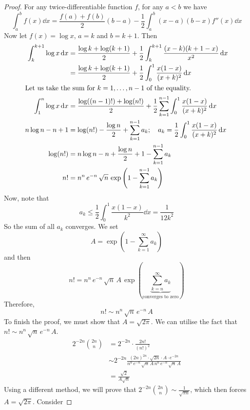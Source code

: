 \documentclass{article}
\begin{document}
\begin{proof}
	For any twice-differentiable function $f$, for any $a < b$ we have
	\[ \int_a^b f(x) \dd{x} = \frac{f(a) + f(b)}{2} (b - a) - \frac{1}{2}\int_a^b (x-a)(b-x)f''(x)\dd{x} \]
	Now let $f(x) = \log x$, $a=k$ and $b=k+1$. Then
	\begin{align*}
		\int_k^{k+1} \log x \dd{x} & = \frac{\log k + \log(k+1)}{2} + \frac{1}{2}\int_k^{k+1} \frac{(x-k)(k+1-x)}{x^2}\dd{x}                            \\
		                           & = \frac{\log k + \log(k+1)}{2} + \frac{1}{2}\int_0^1 \frac{x(1-x)}{(x+k)^2}\dd{x}                                  \\
		\intertext{Let us take the sum for $k=1, \dots, n-1$ of the equality.}
		\int_1^n \log x \dd{x}     & = \frac{\log ((n-1)!) + \log(n!)}{2} + \frac{1}{2}\sum_{k=1}^{n-1}\int_0^1 \frac{x(1-x)}{(x+k)^2}\dd{x}            \\
		n\log n - n + 1            & = \log (n!) - \frac{\log n}{2} + \sum_{k=1}^{n-1} a_k;\quad a_k = \frac{1}{2}\int_0^1 \frac{x(1-x)}{(x+k)^2}\dd{x} \\
		\log (n!)                  & = n \log n - n + \frac{\log n}{2} + 1 - \sum_{k=1}^{n-1} a_k                                                       \\
		n!                         & = n^n \, e^{-n} \, \sqrt n \, \exp\left( 1 - \sum_{k=1}^{n-1} a_k \right)
	\end{align*}
	Now, note that
	\[ a_k \leq \frac{1}{2}\int_0^1 \frac{x(1-x)}{k^2}\dd{x} = \frac{1}{12k^2} \]
	So the sum of all $a_k$ converges. We set
	\[ A = \exp\left( 1 - \sum_{k=1}^\infty a_k \right) \]
	and then
	\[ n! = n^n \, e^{-n} \, \sqrt n \, A \, \exp\left( \underbrace{\sum_{k=n}^\infty a_k}_{\text{converges to zero}} \right) \]
	Therefore,
	\[ n! \sim n^n\, \sqrt{n}\, e^{-n}\, A \]
	To finish the proof, we must show that $A = \sqrt{2 \pi}$. We can utilise the fact that $n! \sim n^n\, \sqrt{n}\, e^{-n}\, A$.
	\begin{align*}
		2^{-2n} \binom{2n}{n} & = 2^{-2n} \cdot \frac{2n!}{(n!)^2}                                                                                           \\
		                      & \sim 2^{-2n} \frac{(2n)^{2n} \cdot \sqrt{2n} \cdot A \cdot e^{-2n}}{n^n\, e^{-n}\, \sqrt n\, A\, n^n\, e^{-n}\, \sqrt n\, A} \\
		                      & = \frac{\sqrt{2}}{A\sqrt{n}}
	\end{align*}
	Using a different method, we will prove that $2^{-2n} \binom{2n}{n} \sim \frac{1}{\sqrt{\pi n}}$, which then forces $A = \sqrt{2\pi}$. Consider

\end{proof}
\end{document}
